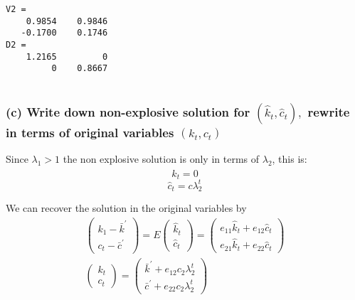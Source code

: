 \documentclass[10pt,notitlepage,onecolumn,aps,pra]{revtex4-1}
\begin{document}
    \begin{Verbatim}[commandchars=\\\{\}]
V2 =
    0.9854    0.9846
   -0.1700    0.1746
D2 =
    1.2165         0
         0    0.8667


    \end{Verbatim}

    \hypertarget{c-write-down-non-explosive-solution-for-lefthatk_t-hatc_tright-rewrite-in-terms-of-original-variables-leftk_t-c_tright}{%
\subsubsection{\texorpdfstring{(c) Write down non-explosive solution for
\(\left(\hat{k}_{t}, \hat{c}_{t}\right),\) rewrite in terms of original
variables
\(\left(k_{t}, c_{t}\right)\)}{(c) Write down non-explosive solution for \textbackslash left(\textbackslash hat\{k\}\_\{t\}, \textbackslash hat\{c\}\_\{t\}\textbackslash right), rewrite in terms of original variables \textbackslash left(k\_\{t\}, c\_\{t\}\textbackslash right)}}\label{c-write-down-non-explosive-solution-for-lefthatk_t-hatc_tright-rewrite-in-terms-of-original-variables-leftk_t-c_tright}}

Since \(\lambda_1>1\) the non explosive solution is only in terms of
\(\lambda_{2}\), this is: \[\hat{k}_t = 0\]
\[\hat{c}_t = c \lambda_2^t\]

We can recover the solution in the original variables by \[
\begin{array}{c}
\left(\begin{array}{c}
k_{1}-\bar{k}^{\prime} \\
c_{t}-\bar{c}^{\prime}
\end{array}\right)=E\left(\begin{array}{c}
\hat{k}_{t} \\
\hat{c}_{t}
\end{array}\right)=\left(\begin{array}{c}
e_{11} \hat{k}_{t}+e_{12} \hat{c}_{t} \\
e_{21} \hat{k}_{t}+e_{22} \hat{c}_{t}
\end{array}\right) \\
\left(\begin{array}{c}
k_{t} \\
c_{t}
\end{array}\right)=\left(\begin{array}{c}
\bar{k}^{\prime}+e_{12} c_{2} \lambda_{2}^{t} \\
\bar{c}^{\prime}+e_{22} c_{2} \lambda_{2}^{t}
\end{array}\right)
\end{array}
\]
\end{document}
